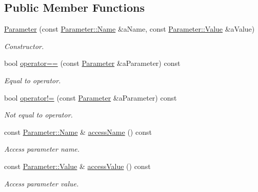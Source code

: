 \subsection*{Public Member Functions}
\begin{DoxyCompactItemize}
\item 
\hyperlink{classlibrary_1_1io_1_1url_1_1_query_1_1_parameter_ad6160646a07cb92213403426dbba4c64}{Parameter} (const \hyperlink{classlibrary_1_1io_1_1url_1_1_query_1_1_parameter_a7edf5fb8a4ae57aed1ce5dfa2405c981}{Parameter\+::\+Name} \&a\+Name, const \hyperlink{classlibrary_1_1io_1_1url_1_1_query_1_1_parameter_a46e7a7b97d44f51f83d6261f70ba0a5e}{Parameter\+::\+Value} \&a\+Value)
\begin{DoxyCompactList}\small\item\em Constructor. \end{DoxyCompactList}\item 
bool \hyperlink{classlibrary_1_1io_1_1url_1_1_query_1_1_parameter_ac00203e201de2c2e510ae59e01a9a12c}{operator==} (const \hyperlink{classlibrary_1_1io_1_1url_1_1_query_1_1_parameter}{Parameter} \&a\+Parameter) const
\begin{DoxyCompactList}\small\item\em Equal to operator. \end{DoxyCompactList}\item 
bool \hyperlink{classlibrary_1_1io_1_1url_1_1_query_1_1_parameter_a5c57390202d4bfb16ef94252f1d4618d}{operator!=} (const \hyperlink{classlibrary_1_1io_1_1url_1_1_query_1_1_parameter}{Parameter} \&a\+Parameter) const
\begin{DoxyCompactList}\small\item\em Not equal to operator. \end{DoxyCompactList}\item 
const \hyperlink{classlibrary_1_1io_1_1url_1_1_query_1_1_parameter_a7edf5fb8a4ae57aed1ce5dfa2405c981}{Parameter\+::\+Name} \& \hyperlink{classlibrary_1_1io_1_1url_1_1_query_1_1_parameter_af91c3c51b261c00262d91f927620cdd2}{access\+Name} () const
\begin{DoxyCompactList}\small\item\em Access parameter name. \end{DoxyCompactList}\item 
const \hyperlink{classlibrary_1_1io_1_1url_1_1_query_1_1_parameter_a46e7a7b97d44f51f83d6261f70ba0a5e}{Parameter\+::\+Value} \& \hyperlink{classlibrary_1_1io_1_1url_1_1_query_1_1_parameter_a7268480834dd6515abe02c4602a9382f}{access\+Value} () const
\begin{DoxyCompactList}\small\item\em Access parameter value. \end{DoxyCompactList}\item 

\end{DoxyCompactItemize}
